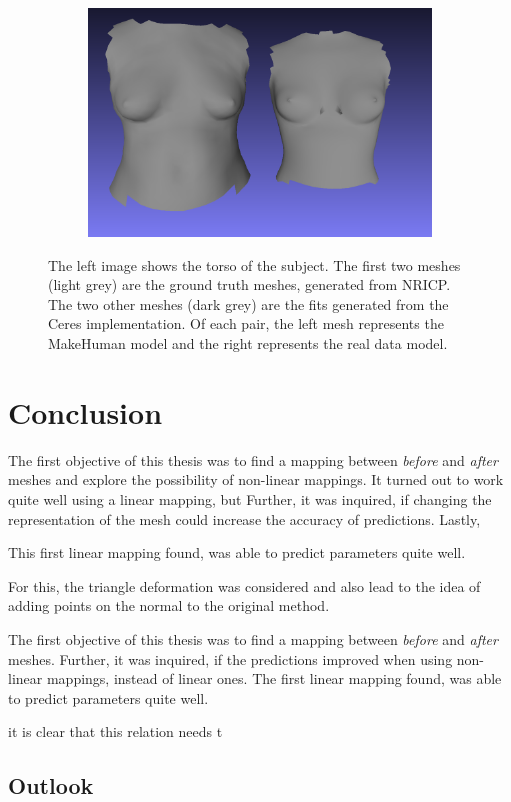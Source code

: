 \begin{figure}
\begin{subfigure}{.37\textwidth}
  \includegraphics[width=1.1\linewidth]{figures/before57_cropped}
\end{subfigure}
\caption[Comparison image, fitted and ICP]{The left image shows the torso of the subject. The first two meshes (light grey) are the ground truth meshes, generated from NRICP. The two other meshes (dark grey) are the fits generated from the Ceres implementation. Of each pair, the left mesh represents the MakeHuman model and the right represents the real data model.}
\label{fig:compimagefiticp}
\end{figure}

\chapter{Conclusion}
The first objective of this thesis was to find a mapping between \textit{before} and \textit{after} meshes and explore the possibility of non-linear mappings. It turned out to work quite well using a linear mapping, but
Further, it was inquired, if changing the representation of the mesh could increase the accuracy of predictions. Lastly,


This first linear mapping found, was able to predict parameters quite well.

For this, the triangle deformation was considered and also lead to the idea of adding points on the normal to the original method.


 The first objective of this thesis was to find a mapping between \textit{before} and \textit{after} meshes. Further, it was inquired, if the predictions improved when using non-linear mappings, instead of linear ones. The first linear mapping found, was able to predict parameters quite well.

it is clear that this relation needs t
\section{Outlook}
